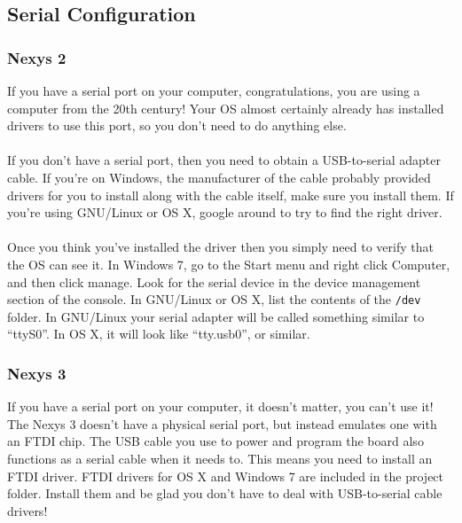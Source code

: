 \documentclass[notitlepage]{article}
\begin{document}
\subsection{Serial Configuration}
\subsubsection{Nexys 2}
If you have a serial port on your computer, congratulations, you are using a computer from the 20th century! Your OS almost certainly already has installed drivers to use this port, so you don't need to do anything else.\\\\
If you don't have a serial port, then you need to obtain a USB-to-serial adapter cable. If you're on Windows, the manufacturer of the cable probably provided drivers for you to install along with the cable itself, make sure you install them. If you're using GNU/Linux or OS X, google around to try to find the right driver.\\\\
Once you think you've installed the driver then you simply need to verify that the OS can see it. In Windows 7, go to the Start menu and right click Computer, and then click manage. Look for the serial device in the device management section of the console. In GNU/Linux or OS X, list the contents of the \texttt{/dev} folder. In GNU/Linux your serial adapter will be called something similar to ``ttyS0''. In OS X, it will look like ``tty.usb0'', or similar.
\subsubsection{Nexys 3}
If you have a serial port on your computer, it doesn't matter, you can't use it! The Nexys 3 doesn't have a physical serial port, but instead emulates one with an FTDI chip. The USB cable you use to power and program the board also functions as a serial cable when it needs to. This means you need to install an FTDI driver. FTDI drivers for OS X and Windows 7 are included in the project folder. Install them and be glad you don't have to deal with USB-to-serial cable drivers!
\end{document}
